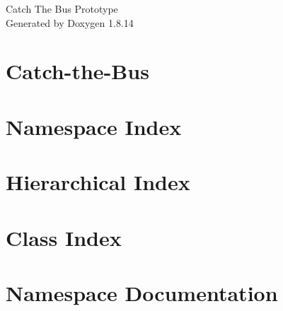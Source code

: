 \documentclass[twoside]{book}
\newcommand{\+}{\discretionary{\mbox{\scriptsize$\hookleftarrow$}}{}{}}
\newcommand{\clearemptydoublepage}{%
  \newpage{\pagestyle{empty}\cleardoublepage}%
}
\begin{document}
\hypersetup{pageanchor=false,
             bookmarksnumbered=true,
             pdfencoding=unicode
            }
\begin{titlepage}
\vspace*{7cm}
\begin{center}%
{\Large Catch The Bus Prototype }\\
\vspace*{1cm}
{\large Generated by Doxygen 1.8.14}\\
\end{center}
\end{titlepage}
\clearemptydoublepage
{}
\tableofcontents
\clearemptydoublepage
{}
\hypersetup{pageanchor=true}

\chapter{Catch-\/the-\/\+Bus}
\label{md__d_1__users__bennett__desktop__school__e_e_c_s_448__catch-the-_bus__r_e_a_d_m_e}

\chapter{Namespace Index}

\chapter{Hierarchical Index}

\chapter{Class Index}

\chapter{Namespace Documentation}

\end{document}
